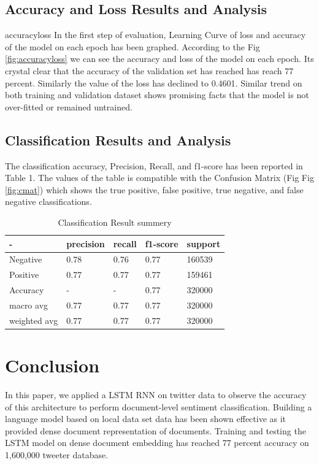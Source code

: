\documentclass[journal]{IEEEtran}
\begin{document}
\subsection{Accuracy and Loss Results and Analysis} accuracyloss
In the first step of evaluation, Learning Curve of loss and accuracy of the model on each epoch has been graphed. According to the Fig  \ref{fig:accuracyloss} we can see the accuracy and loss of the model on each epoch. Its crystal clear that the accuracy of the validation set has reached  has reach 77 percent. Similarly the value of the loss has declined to 0.4601. Similar trend on both training and validation dataset shows promising facts that the model is not over-fitted or remained untrained.


\subsection{Classification Results and Analysis}
The classification accuracy, Precision, Recall, and f1-score has been reported in Table 1. The values of the table is compatible with the Confusion Matrix (Fig Fig  \ref{fig:cmat}) which shows the true positive, false positive, true negative, and false negative classifications. 


\begin{table}[]
\caption{Classification Result summery}
\label{tab:my-table}
\begin{tabular}{|l|l|l|l|l|}
\hline
- & precision & recall & f1-score & support \\ \hline
Negative & 0.78 & 0.76 & 0.77 & 160539 \\ \hline
Positive & 0.77 & 0.77 & 0.77 & 159461 \\ \hline
Accuracy & - & - & 0.77 & 320000 \\ \hline
macro avg & 0.77 & 0.77 & 0.77 & 320000 \\ \hline
weighted avg & 0.77 & 0.77 & 0.77 & 320000 \\ \hline
\end{tabular}
\end{table}





\section{Conclusion}
In this paper, we applied a LSTM RNN on twitter data to observe the accuracy of this architecture to perform  document-level sentiment classification. Building a language model based on local data set data has been shown effective as it provided dense document representation of documents. Training and testing the LSTM model on dense document embedding has reached 77 percent accuracy on 1,600,000 tweeter database.  
\end{document}

